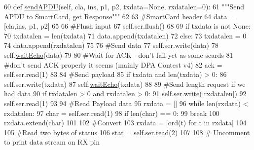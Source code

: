 \begin{DoxyCode}
60     \textcolor{keyword}{def }\hyperlink{classsoftware_1_1chipwhisperer_1_1capture_1_1targets_1_1smartcard__readers_1_1chipwhisperer__ser_1_1ReaderChipWhispererSER_acdc60f26527404f2cab0a7df2c6fda64}{sendAPDU}(self, cla, ins, p1, p2, txdata=None, rxdatalen=0):
61         \textcolor{stringliteral}{"""Send APDU to SmartCard, get Response"""}
62 
63         \textcolor{comment}{#SmartCard header}
64         data = [cla,ins, p1, p2]
65 
66         \textcolor{comment}{#Flush input}
67         self.ser.flush()
68 
69         \textcolor{keywordflow}{if} txdata \textcolor{keywordflow}{is} \textcolor{keywordflow}{not} \textcolor{keywordtype}{None}:
70             txdatalen = len(txdata)
71             data.append(txdatalen)
72         \textcolor{keywordflow}{else}:
73             txdatalen = 0
74             data.append(rxdatalen)
75 
76         \textcolor{comment}{#Send data}
77         self.ser.write(data)
78         self.\hyperlink{classsoftware_1_1chipwhisperer_1_1capture_1_1targets_1_1smartcard__readers_1_1chipwhisperer__ser_1_1ReaderChipWhispererSER_aeccccaf9a1c86be8c1cb8b732ad7286f}{waitEcho}(data)
79 
80         \textcolor{comment}{#Wait for ACK - don't fail yet as some scards}
81         \textcolor{comment}{#don't send ACK properly it seems (mainly DPA Contest v4)}
82         ack = self.ser.read(1)
83 
84         \textcolor{comment}{#Send payload}
85         \textcolor{keywordflow}{if} txdata \textcolor{keywordflow}{and} len(txdata) > 0:
86             self.ser.write(txdata)
87             self.\hyperlink{classsoftware_1_1chipwhisperer_1_1capture_1_1targets_1_1smartcard__readers_1_1chipwhisperer__ser_1_1ReaderChipWhispererSER_aeccccaf9a1c86be8c1cb8b732ad7286f}{waitEcho}(txdata)
88 
89         \textcolor{comment}{#Send length request if we had data}
90         \textcolor{keywordflow}{if} txdatalen > 0 \textcolor{keywordflow}{and} rxdatalen > 0:
91             self.ser.write([rxdatalen])
92             self.ser.read(1)
93 
94         \textcolor{comment}{#Read Payload data}
95         rxdata = []
96         \textcolor{keywordflow}{while} len(rxdata) < rxdatalen:
97             char = self.ser.read(1)
98             \textcolor{keywordflow}{if} len(char) == 0:
99                 \textcolor{keywordflow}{break}
100             rxdata.extend(char)
101 
102         \textcolor{comment}{#Convert}
103         rxdata = [ord(t) \textcolor{keywordflow}{for} t \textcolor{keywordflow}{in} rxdata]
104 
105         \textcolor{comment}{#Read two bytes of status}
106         stat = self.ser.read(2)
107 
108         \textcolor{comment}{# Uncomment to print data stream on RX pin}

\end{DoxyCode}
